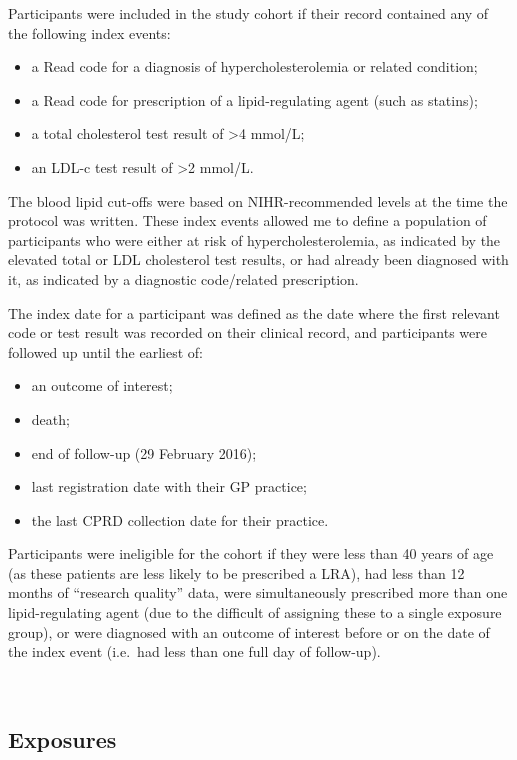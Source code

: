 \documentclass[a4paper, twoside]{templates/ociamthesis}
\providecommand{\tightlist}{%
  \setlength{\itemsep}{0pt}\setlength{\parskip}{0pt}}
\begin{document}
Participants were included in the study cohort if their record contained any of the following index events:

\begin{itemize}
\tightlist
\item
  a Read code for a diagnosis of hypercholesterolemia or related condition;
\item
  a Read code for prescription of a lipid-regulating agent (such as statins);
\item
  a total cholesterol test result of \textgreater4 mmol/L;
\item
  an LDL-c test result of \textgreater2 mmol/L.
\end{itemize}

The blood lipid cut-offs were based on NIHR-recommended levels at the time the protocol was written. These index events allowed me to define a population of participants who were either at risk of hypercholesterolemia, as indicated by the elevated total or LDL cholesterol test results, or had already been diagnosed with it, as indicated by a diagnostic code/related prescription.

The index date for a participant was defined as the date where the first relevant code or test result was recorded on their clinical record, and participants were followed up until the earliest of:

\begin{itemize}
\tightlist
\item
  an outcome of interest;
\item
  death;
\item
  end of follow-up (29 February 2016);
\item
  last registration date with their GP practice;
\item
  the last CPRD collection date for their practice.
\end{itemize}

Participants were ineligible for the cohort if they were less than 40 years of age (as these patients are less likely to be prescribed a LRA), had less than 12 months of ``research quality'' data, were simultaneously prescribed more than one lipid-regulating agent (due to the difficult of assigning these to a single exposure group), or were diagnosed with an outcome of interest before or on the date of the index event (i.e.~had less than one full day of follow-up).

~

\hypertarget{exposures}{%
\subsection{Exposures}\label{exposures}}
\end{document}
